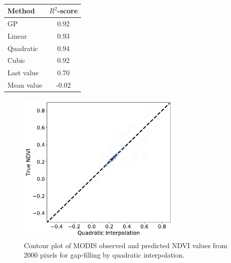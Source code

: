 \documentclass[review]{elsarticle}
\begin{document}
\begin{table}
	\caption{ 
	} \label{tab:comp_int2}
	\centering
	\begin{tabular}{lc} 
		\toprule
		\textbf{Method}  & \textbf{$R^2$-score} \\
		\midrule
		GP & 0.92 \\
		Linear & 0.93\\
		Quadratic & 0.94\\
		Cubic & 0.92\\
		Last value & 0.70\\
		Mean value & -0.02\\
		\bottomrule
	\end{tabular}
\end{table}
\vspace{2cm}
\begin{figure}[H]
	\centering
	\includegraphics[trim = 30mm 5mm 5mm 15mm,width=8cm]{figures/QuadraticInt_contour.pdf} 
	\caption{Contour plot of MODIS observed and predicted NDVI values from 2000 pixels for gap-filling by quadratic interpolation.} \label{fig:interpScatter}
\end{figure}

\end{document}
